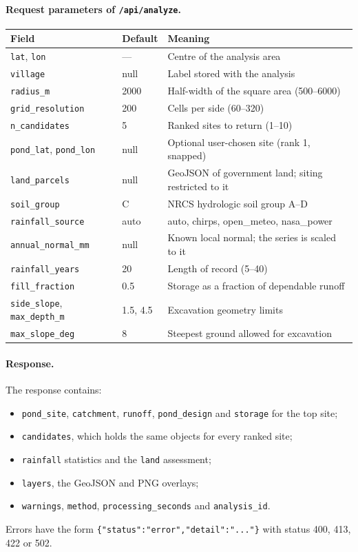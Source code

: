 \documentclass[11pt,a4paper]{article}
\newcommand{\code}[1]{\texttt{\small #1}}
\begin{document}
\paragraph{Request parameters of \code{/api/analyze}.}
\begin{center}\small
\begin{tabularx}{\textwidth}{@{}llY@{}}
\toprule
Field & Default & Meaning \\
\midrule
\code{lat}, \code{lon} & --- & Centre of the analysis area \\
\code{village} & null & Label stored with the analysis \\
\code{radius\_m} & 2000 & Half-width of the square area (500--6000) \\
\code{grid\_resolution} & 200 & Cells per side (60--320) \\
\code{n\_candidates} & 5 & Ranked sites to return (1--10) \\
\code{pond\_lat}, \code{pond\_lon} & null & Optional user-chosen site (rank 1, snapped) \\
\code{land\_parcels} & null & GeoJSON of government land; siting restricted to it \\
\code{soil\_group} & C & NRCS hydrologic soil group A--D \\
\code{rainfall\_source} & auto & auto, chirps, open\_meteo, nasa\_power \\
\code{annual\_normal\_mm} & null & Known local normal; the series is scaled to it \\
\code{rainfall\_years} & 20 & Length of record (5--40) \\
\code{fill\_fraction} & 0.5 & Storage as a fraction of dependable runoff \\
\code{side\_slope}, \code{max\_depth\_m} & 1.5, 4.5 & Excavation geometry limits \\
\code{max\_slope\_deg} & 8 & Steepest ground allowed for excavation \\
\bottomrule
\end{tabularx}
\end{center}

\paragraph{Response.} The response contains:
\begin{itemize}
  \item \code{pond\_site}, \code{catchment}, \code{runoff}, \code{pond\_design} and
        \code{storage} for the top site;
  \item \code{candidates}, which holds the same objects for every ranked site;
  \item \code{rainfall} statistics and the \code{land} assessment;
  \item \code{layers}, the GeoJSON and PNG overlays;
  \item \code{warnings}, \code{method}, \code{processing\_seconds} and \code{analysis\_id}.
\end{itemize}
Errors have the form \code{\{"status":"error","detail":"..."\}} with status 400, 413, 422 or
502.
\end{document}
